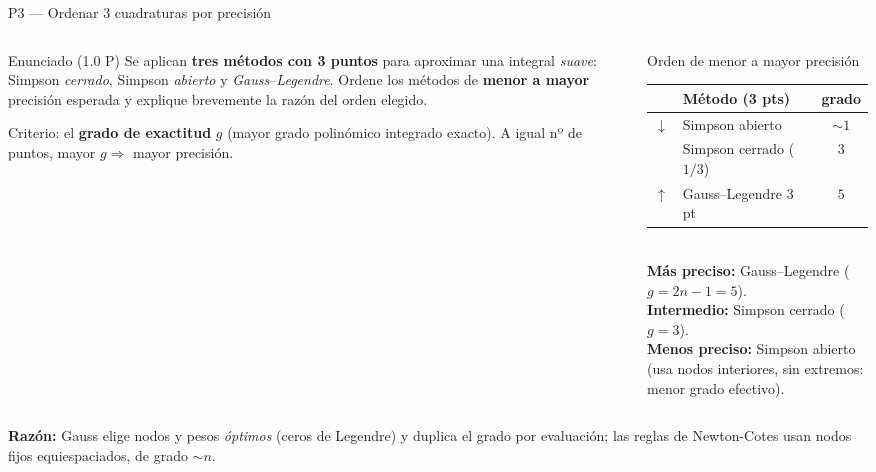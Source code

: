 \documentclass[aspectratio=169,10pt]{beamer}
\begin{document}
\begin{frame}{P3 — Ordenar 3 cuadraturas por precisión}
\begin{columns}[T]
\begin{column}{0.48\textwidth}
\begin{cardidea}{Enunciado \textmd{\small(1.0 P)}}{\faQuestionCircle}
{\footnotesize Se aplican \textbf{tres métodos con 3 puntos} para aproximar una integral \emph{suave}: Simpson \emph{cerrado}, Simpson \emph{abierto} y \emph{Gauss--Legendre}. Ordene los métodos de \textbf{menor a mayor} precisión esperada y explique brevemente la razón del orden elegido.}
\end{cardidea}
\vspace{1mm}
\begin{cardnota}[\faKey]
{\footnotesize Criterio: el \textbf{grado de exactitud} $g$ (mayor grado polinómico integrado exacto). A igual nº de puntos, mayor $g\Rightarrow$ mayor precisión.}
\end{cardnota}
\end{column}
\begin{column}{0.50\textwidth}
\begin{cardgear}{Orden de menor a mayor precisión}{\faSortAmountUp}
\centering
{\footnotesize\renewcommand{\arraystretch}{1.35}\setlength{\tabcolsep}{6pt}
\begin{tabular}{c|l|c}
 & Método (3 pts) & grado\\\hline
$\downarrow$ & Simpson abierto & $\sim1$\\
 & Simpson cerrado ($1/3$) & $3$\\
$\uparrow$ & Gauss--Legendre 3 pt & $5$\\
\end{tabular}}\\[1.4mm]
{\footnotesize \textbf{Más preciso:} Gauss--Legendre ($g=2n-1=5$).\\[0.4mm]
\textbf{Intermedio:} Simpson cerrado ($g=3$).\\[0.4mm]
\textbf{Menos preciso:} Simpson abierto (usa nodos interiores, sin extremos: menor grado efectivo).}
\end{cardgear}
\end{column}
\end{columns}
\vspace{1.5mm}
\begin{cardnota}[\faLightbulb]
{\footnotesize \textbf{Razón:} Gauss elige nodos y pesos \emph{óptimos} (ceros de Legendre) y duplica el grado por evaluación; las reglas de Newton-Cotes usan nodos fijos equiespaciados, de grado $\sim n$.}
\end{cardnota}
\end{frame}
\end{document}
